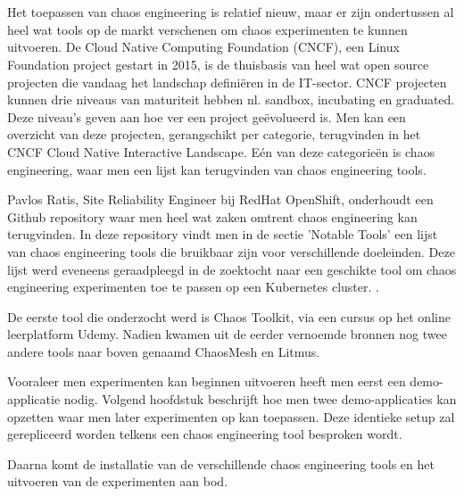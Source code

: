 
\chapter{}
\label{ch:chaostools}

Het toepassen van chaos engineering is relatief nieuw, maar er zijn ondertussen al heel wat tools op de markt verschenen om chaos experimenten te kunnen uitvoeren. De Cloud Native Computing Foundation (CNCF), een Linux Foundation project gestart in 2015, is de thuisbasis van heel wat open source projecten die vandaag het landschap definiëren in de IT-sector. CNCF projecten kunnen drie niveaus van maturiteit hebben nl. sandbox, incubating en graduated. Deze niveau's geven aan hoe ver een project geëvolueerd is. \autocite{CNCF2022a}
\newline Men kan een overzicht van deze projecten, gerangschikt per categorie, terugvinden in het CNCF Cloud Native Interactive Landscape. Eén van deze categorieën is chaos engineering, waar men  een lijst kan terugvinden van chaos engineering tools. \autocite{CloudNativeLandscape2022}

Pavlos Ratis, Site Reliability Engineer bij RedHat OpenShift, onderhoudt een Github repository  waar men heel wat zaken omtrent chaos engineering kan terugvinden. In deze repository vindt men in de sectie 'Notable Tools' een lijst van chaos engineering tools die bruikbaar zijn voor verschillende doeleinden. Deze lijst werd eveneens geraadpleegd in de zoektocht naar een geschikte tool om chaos engineering experimenten toe te passen op een Kubernetes cluster. \autocite{Ratis2022}.

De eerste tool die onderzocht werd is Chaos Toolkit, via een cursus op het online leerplatform Udemy. Nadien kwamen uit de eerder vernoemde bronnen nog twee andere tools naar boven genaamd ChaosMesh en Litmus.

Vooraleer men experimenten kan beginnen uitvoeren heeft men eerst een demo-applicatie nodig. Volgend hoofdstuk beschrijft hoe men twee demo-applicaties kan opzetten waar men later experimenten op kan toepassen. Deze identieke setup zal gerepliceerd worden telkens een chaos engineering tool besproken wordt.

Daarna komt de installatie van de verschillende chaos engineering tools en het uitvoeren van de experimenten aan bod.

